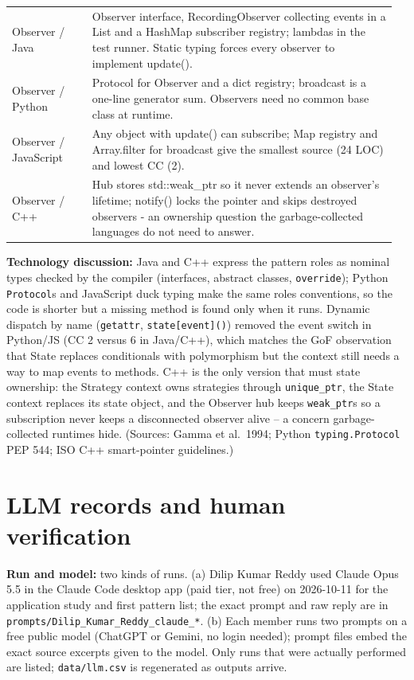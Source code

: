\documentclass[11pt,a4paper]{article}
\begin{document}
\begin{longtable}{@{}P{0.2\linewidth}P{0.76\linewidth}@{}}
Observer / Java & Observer interface, RecordingObserver collecting events in a List and a HashMap subscriber registry; lambdas in the test runner. Static typing forces every observer to implement update(). \\
Observer / Python & Protocol for Observer and a dict registry; broadcast is a one-line generator sum. Observers need no common base class at runtime. \\
Observer / JavaScript & Any object with update() can subscribe; Map registry and Array.filter for broadcast give the smallest source (24 LOC) and lowest CC (2). \\
Observer / C++ & Hub stores std::weak\_ptr so it never extends an observer's lifetime; notify() locks the pointer and skips destroyed observers - an ownership question the garbage-collected languages do not need to answer. \\
\bottomrule\end{longtable}

\textbf{Technology discussion:} Java and C++ express the pattern roles as nominal types checked by the compiler (interfaces, abstract
classes, \texttt{override}); Python \texttt{Protocol}s and JavaScript duck typing make the same roles conventions, so the code is shorter
but a missing method is found only when it runs. Dynamic dispatch by name (\texttt{getattr}, \texttt{state[event]()}) removed the event
switch in Python/JS (CC 2 versus 6 in Java/C++), which matches the GoF observation that State replaces conditionals with polymorphism but
the context still needs a way to map events to methods. C++ is the only version that must state ownership: the Strategy context owns
strategies through \texttt{unique\_ptr}, the State context replaces its state object, and the Observer hub keeps \texttt{weak\_ptr}s so a
subscription never keeps a disconnected observer alive -- a concern garbage-collected runtimes hide. (Sources: Gamma et al.\ 1994; Python
\texttt{typing.Protocol} PEP 544; ISO C++ smart-pointer guidelines.)

\section{LLM records and human verification}\label{sec:llm}
\textbf{Run and model:} two kinds of runs. (a) Dilip Kumar Reddy used Claude Opus 5.5 in the Claude Code desktop app (paid tier, not free) on 2026-10-11 for
the application study and first pattern list; the exact prompt and raw reply are in \texttt{prompts/Dilip\_Kumar\_Reddy\_claude\_*}. (b) Each member runs two
prompts on a free public model (ChatGPT or Gemini, no login needed); prompt files embed the exact source excerpts given to the model.
Only runs that were actually performed are listed; \texttt{data/llm.csv} is regenerated as outputs arrive.
\end{document}
